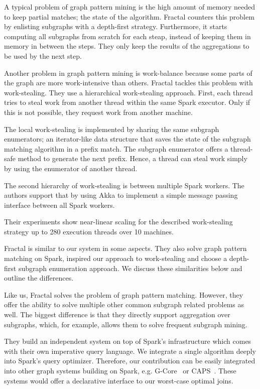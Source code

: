 A typical problem of graph pattern mining is the high amount of memory needed to keep partial matches;
the state of the algorithm.
Fractal counters this problem by enlisting subgraphs with a depth-first strategy.
Furthermore, it starts computing all subgraphs from scratch for each steap, instead of keeping them in
memory in between the steps.
They only keep the results of the aggregations to be used by the next step.

Another problem in graph pattern mining is work-balance because some parts of the graph are
more work-intensive than others.
Fractal tackles this problem with work-stealing.
They use a hierarchical work-stealing approach.
First, each thread tries to steal work from another thread within the same Spark executor.
Only if this is not possible, they request work from another machine.

The local work-stealing is implemented by sharing the same subgraph enumerators;
an iterator-like data structure that saves the state of the subgraph matching algorithm in a prefix
match.
The subgraph enumerator offers a thread-safe method to generate the next prefix.
Hence, a thread can steal work simply by using the enumerator of another thread.

The second hierarchy of work-stealing is between multiple Spark workers.
The authors support that by using Akka to implement a simple message passing interface between
all Spark workers.

Their experiments show near-linear scaling for the described work-stealing strategy up to 280
execution threads over 10 machines.

Fractal is similar to our system in some aspects.
They also solve graph pattern matching on Spark, inspired our approach to work-stealing and
choose a depth-first subgraph enumeration approach.
We discuss these similarities below and outline the differences.

Like us, Fractal solves the problem of graph pattern matching.
However, they offer the ability to solve multiple other common subgraph related problems as well.
The biggest difference is that they directly support aggregation over subgraphs, which, for example,
allows them to solve frequent subgraph mining.

They build an independent system on top of Spark's infrastructure which comes with their own
imperative query language.
We integrate a single algorithm deeply into Spark's query optimizer.
Therefore, our contribution can be easily integrated into other graph systems building on Spark, e.g.
G-Core~\cite{gcore} or CAPS~\cite{caps}.
These systems would offer a declarative interface to our worst-case optimal joins.

